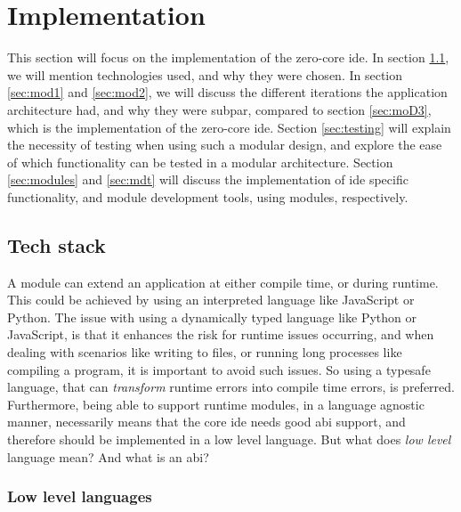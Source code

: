 \chapter{Implementation} \label{cha:impl}

This section will focus on the implementation of the zero-core \gls*{ide}. In
section \ref{sec:stack}, we will mention technologies used, and why they were
chosen. In section \ref{sec:mod1} and \ref{sec:mod2}, we will discuss the
different iterations the application architecture had, and why they were subpar,
compared to section \ref{sec:moD3}, which is the implementation of the zero-core
\gls*{ide}. Section \ref{sec:testing} will explain the necessity of testing when
using such a modular design, and explore the ease of which functionality can be
tested in a modular architecture. Section \ref{sec:modules} and \ref{sec:mdt}
will discuss the implementation of \gls{ide} specific functionality, and
module development tools, using modules, respectively.

\section{Tech stack} \label{sec:stack}

A module can extend an application at either compile time, or during runtime.
This could be achieved by using an interpreted language like JavaScript or
Python. The issue with using a dynamically typed language like Python or
JavaScript, is that it enhances the risk for runtime issues occurring, and when
dealing with scenarios like writing to files, or running long processes like
compiling a program, it is important to avoid such issues. So using a typesafe
language, that can \textit{transform} runtime errors into compile time errors,
is preferred. Furthermore, being able to support runtime modules, in a language
agnostic manner, necessarily means that the core \gls*{ide} needs good
\gls*{abi} support, and therefore should be implemented in a low level language.
But what does \textit{low level} language mean? And what is an \gls*{abi}?

\subsection{Low level languages}

